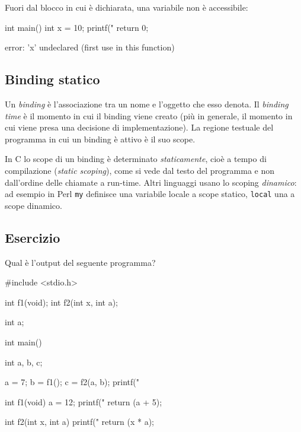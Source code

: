 \documentclass[11pt,a4paper]{article}
\begin{document}
\begin{esempio}
Fuori dal blocco in cui è dichiarata, una variabile non è accessibile:
\begin{codice}
int main() {
    {
        int x = 10;
    }
    {
        printf("%
    }
    return 0;
}
\end{codice}
\begin{risultato}
error: 'x' undeclared (first use in this function)
\end{risultato}
\end{esempio}

\subsection{Binding statico}

\begin{definizione}
Un \emph{binding} è l'associazione tra un nome e l'oggetto che esso denota. Il
\emph{binding time} è il momento in cui il binding viene creato (più in
generale, il momento in cui viene presa una decisione di implementazione). La
regione testuale del programma in cui un binding è attivo è il suo scope.
\end{definizione}

In C lo scope di un binding è determinato \emph{staticamente}, cioè a tempo di
compilazione (\emph{static scoping}), come si vede dal testo del programma e non
dall'ordine delle chiamate a run-time. Altri linguaggi usano lo scoping
\emph{dinamico}: ad esempio in Perl \lstinline|my| definisce una variabile
locale a scope statico, \lstinline|local| una a scope dinamico.

\subsection{Esercizio}

\begin{esercizio}
Qual è l'output del seguente programma?
\begin{codice}
#include <stdio.h>

int f1(void);
int f2(int x, int a);

int a;

int main() {
    int a, b, c;

    a = 7;
    b = f1();
    c = f2(a, b);
    printf("%
}

int f1(void) {
    a = 12;
    printf("%
    return (a + 5);
}

int f2(int x, int a) {
    printf("%
    return (x * a);
}
\end{codice}
\end{esercizio}
\end{document}
